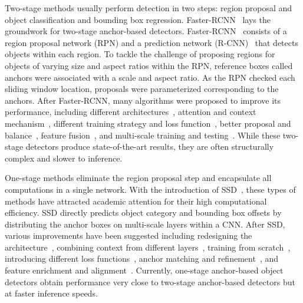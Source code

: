 \documentclass[journal]{IEEEtran}
\begin{document}
Two-stage methods usually perform detection in two steps:  region proposal and  object classification and bounding box regression. Faster-RCNN~\cite{ren2015faster} lays the groundwork for two-stage anchor-based detectors. Faster-RCNN~\cite{ren2015faster} consists of a region proposal network (RPN) and a prediction network (R-CNN)~\cite{girshick2014rich, girshick2015fast} that detects objects within each region. To tackle the challenge of proposing regions for objects of varying size and aspect ratios within the RPN, reference boxes called anchors were associated with a scale and aspect ratio. As the RPN checked each sliding window location,  proposals were parameterized corresponding to the  anchors. After Faster-RCNN, many algorithms were proposed to improve its performance, including different architectures~\cite{cai2016unified, dai2016r, cai2018cascade, lee2019me}, attention and context mechanism~\cite{bell2016inside, shrivastava2016contextual, liu2018structure, chen2018context}, different training strategy and loss function~\cite{najibi2016g, shrivastava2016training, wang2017fast, he2019bounding}, better proposal and balance~\cite{tan2019learning, pang2019libra}, feature fusion~\cite{lin2017feature}, and multi-scale training and testing~\cite{singh2018analysis, najibi2019autofocus}. While these two-stage detectors produce state-of-the-art results, they are often structurally complex and slower to inference.

One-stage methods eliminate the region proposal step and encapsulate all computations in a single network. With the introduction of SSD~\cite{liu2016ssd}, these types of methods have attracted academic attention for their high computational efficiency. SSD directly predicts object category and bounding box offsets by distributing the anchor boxes on multi-scale layers within a CNN. After SSD, various improvements have been suggested including redesigning the architecture~\cite{kim2018parallel, kong2018deep}, combining context from different layers~\cite{kong2017ron, fu2017dssd}, training from scratch~\cite{shen2017dsod, zhu2019scratchdet}, introducing different loss functions~\cite{chen2019towards, lin2017focal}, anchor matching and refinement~\cite{zhang2018single, zhang2020bridging}, and feature enrichment and alignment~\cite{liu2018receptive, zhang2018single, wang2019learning}. Currently, one-stage anchor-based object detectors obtain performance very close to two-stage anchor-based detectors but at faster inference speeds.
\end{document}
